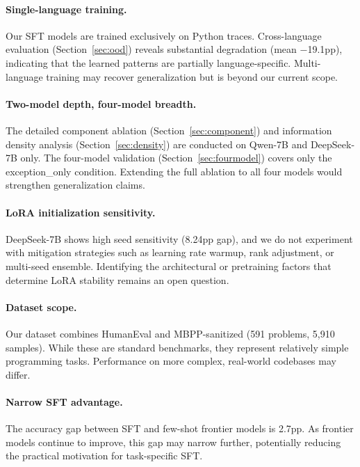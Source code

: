 \documentclass[11pt]{article}
\begin{document}
\paragraph{Single-language training.} Our SFT models are trained exclusively on Python traces. Cross-language evaluation (Section~\ref{sec:ood}) reveals substantial degradation (mean $-$19.1pp), indicating that the learned patterns are partially language-specific. Multi-language training may recover generalization but is beyond our current scope.

\paragraph{Two-model depth, four-model breadth.} The detailed component ablation (Section~\ref{sec:component}) and information density analysis (Section~\ref{sec:density}) are conducted on Qwen-7B and DeepSeek-7B only. The four-model validation (Section~\ref{sec:fourmodel}) covers only the exception\_only condition. Extending the full ablation to all four models would strengthen generalization claims.

\paragraph{LoRA initialization sensitivity.} DeepSeek-7B shows high seed sensitivity (8.24pp gap), and we do not experiment with mitigation strategies such as learning rate warmup, rank adjustment, or multi-seed ensemble. Identifying the architectural or pretraining factors that determine LoRA stability remains an open question.

\paragraph{Dataset scope.} Our dataset combines HumanEval and MBPP-sanitized (591 problems, 5,910 samples). While these are standard benchmarks, they represent relatively simple programming tasks. Performance on more complex, real-world codebases may differ.

\paragraph{Narrow SFT advantage.} The accuracy gap between SFT and few-shot frontier models is 2.7pp. As frontier models continue to improve, this gap may narrow further, potentially reducing the practical motivation for task-specific SFT.

\end{document}

